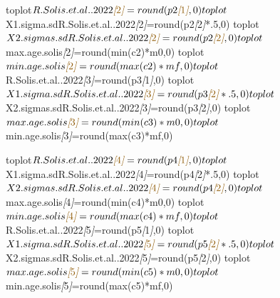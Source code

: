 \documentclass[
]{article}
\newenvironment{Shaded}{\begin{snugshade}}{\end{snugshade}}
\newcommand{\CommentTok}[1]{\textcolor[rgb]{0.56,0.35,0.01}{\textit{#1}}}
\newcommand{\NormalTok}[1]{#1}
\newcommand{\OtherTok}[1]{\textcolor[rgb]{0.56,0.35,0.01}{#1}}
\begin{document}
\begin{Shaded}
\begin{Highlighting}[]
\NormalTok{toplot$R.Solis.et.al..2022}\CommentTok{[}\OtherTok{2}\CommentTok{]}\NormalTok{=round(p2}\CommentTok{[}\OtherTok{1}\CommentTok{]}\NormalTok{,0)}
\NormalTok{toplot$X1.sigma.sdR.Solis.et.al..2022}\CommentTok{[}\OtherTok{2}\CommentTok{]}\NormalTok{=round(p2}\CommentTok{[}\OtherTok{2}\CommentTok{]}\NormalTok{*.5,0)}
\NormalTok{toplot$X2.sigmas.sdR.Solis.et.al..2022}\CommentTok{[}\OtherTok{2}\CommentTok{]}\NormalTok{=round(p2}\CommentTok{[}\OtherTok{2}\CommentTok{]}\NormalTok{,0)}
\NormalTok{toplot$max.age.solis}\CommentTok{[}\OtherTok{2}\CommentTok{]}\NormalTok{=round(min(c2)*m0,0)}
\NormalTok{toplot$min.age.solis}\CommentTok{[}\OtherTok{2}\CommentTok{]}\NormalTok{=round(max(c2)*mf,0)}

\NormalTok{toplot$R.Solis.et.al..2022}\CommentTok{[}\OtherTok{3}\CommentTok{]}\NormalTok{=round(p3}\CommentTok{[}\OtherTok{1}\CommentTok{]}\NormalTok{,0)}
\NormalTok{toplot$X1.sigma.sdR.Solis.et.al..2022}\CommentTok{[}\OtherTok{3}\CommentTok{]}\NormalTok{=round(p3}\CommentTok{[}\OtherTok{2}\CommentTok{]}\NormalTok{*.5,0)}
\NormalTok{toplot$X2.sigmas.sdR.Solis.et.al..2022}\CommentTok{[}\OtherTok{3}\CommentTok{]}\NormalTok{=round(p3}\CommentTok{[}\OtherTok{2}\CommentTok{]}\NormalTok{,0)}
\NormalTok{toplot$max.age.solis}\CommentTok{[}\OtherTok{3}\CommentTok{]}\NormalTok{=round(min(c3)*m0,0)}
\NormalTok{toplot$min.age.solis}\CommentTok{[}\OtherTok{3}\CommentTok{]}\NormalTok{=round(max(c3)*mf,0)}

\NormalTok{toplot$R.Solis.et.al..2022}\CommentTok{[}\OtherTok{4}\CommentTok{]}\NormalTok{=round(p4}\CommentTok{[}\OtherTok{1}\CommentTok{]}\NormalTok{,0)}
\NormalTok{toplot$X1.sigma.sdR.Solis.et.al..2022}\CommentTok{[}\OtherTok{4}\CommentTok{]}\NormalTok{=round(p4}\CommentTok{[}\OtherTok{2}\CommentTok{]}\NormalTok{*.5,0)}
\NormalTok{toplot$X2.sigmas.sdR.Solis.et.al..2022}\CommentTok{[}\OtherTok{4}\CommentTok{]}\NormalTok{=round(p4}\CommentTok{[}\OtherTok{2}\CommentTok{]}\NormalTok{,0)}
\NormalTok{toplot$max.age.solis}\CommentTok{[}\OtherTok{4}\CommentTok{]}\NormalTok{=round(min(c4)*m0,0)}
\NormalTok{toplot$min.age.solis}\CommentTok{[}\OtherTok{4}\CommentTok{]}\NormalTok{=round(max(c4)*mf,0)}

\NormalTok{toplot$R.Solis.et.al..2022}\CommentTok{[}\OtherTok{5}\CommentTok{]}\NormalTok{=round(p5}\CommentTok{[}\OtherTok{1}\CommentTok{]}\NormalTok{,0)}
\NormalTok{toplot$X1.sigma.sdR.Solis.et.al..2022}\CommentTok{[}\OtherTok{5}\CommentTok{]}\NormalTok{=round(p5}\CommentTok{[}\OtherTok{2}\CommentTok{]}\NormalTok{*.5,0)}
\NormalTok{toplot$X2.sigmas.sdR.Solis.et.al..2022}\CommentTok{[}\OtherTok{5}\CommentTok{]}\NormalTok{=round(p5}\CommentTok{[}\OtherTok{2}\CommentTok{]}\NormalTok{,0)}
\NormalTok{toplot$max.age.solis}\CommentTok{[}\OtherTok{5}\CommentTok{]}\NormalTok{=round(min(c5)*m0,0)}
\NormalTok{toplot$min.age.solis}\CommentTok{[}\OtherTok{5}\CommentTok{]}\NormalTok{=round(max(c5)*mf,0)}


\end{Highlighting}
\end{Shaded}
\end{document}
